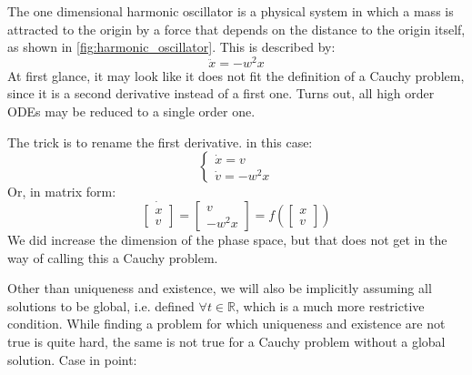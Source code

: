 \begin{example}
    The one dimensional harmonic oscillator is a physical system in which a mass is attracted to the origin by a force that depends on the distance to the origin itself, as shown in \autoref{fig:harmonic_oscillator}. This is described by:
    \begin{equation}
        \ddot{x}=-w^2x
    \end{equation}
    At first glance, it may look like it does not fit the definition of a Cauchy problem, since it is a second derivative instead of a first one. Turns out, all high order ODEs may be reduced to a single order one. 

    The trick is to rename the first derivative. in this case:
    \begin{equation*}
        \begin{cases}
            \dot{x}=v \\
            \dot{v}=-w^2x
        \end{cases}
    \end{equation*}
    Or, in matrix form:
    \begin{equation*}
        \dot{\begin{bmatrix}x \\ v\end{bmatrix}}=\begin{bmatrix} v \\ -w^2x\end{bmatrix}=f\left(\begin{bmatrix} x \\ v\end{bmatrix}\right)
    \end{equation*}
    We did increase the dimension of the phase space, but that does not get in the way of calling this a Cauchy problem.
\end{example}

Other than uniqueness and existence, we will also be implicitly assuming  all solutions to be global, i.e. defined $\forall t\in\mathbb{R}$, which is a much more restrictive condition. While finding a problem for which uniqueness and existence are not true is quite hard, the same is not true for a Cauchy problem without a global solution. Case in point:

